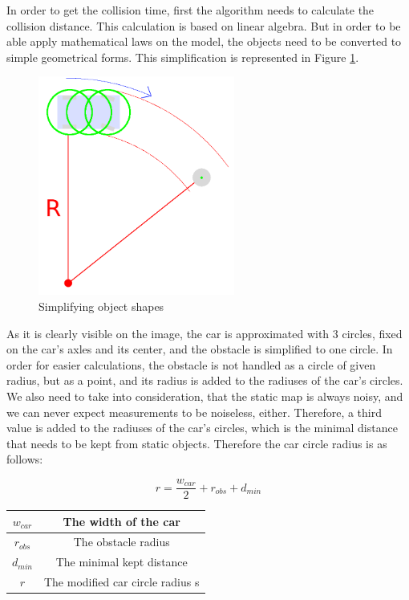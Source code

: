 In order to get the collision time, first the algorithm needs to calculate the collision distance. This calculation is based on linear algebra. But in order to be able apply mathematical laws on the model, the objects need to be converted to simple geometrical forms. This simplification is represented in Figure \ref{static_collision_time_check_object_simplification}.

\begin{figure}[!ht]
    \centering
    \includegraphics[height=72mm]{figures/raw/static_collision_time_check_object_simplification.png}
    \caption{Simplifying object shapes}
    \label{static_collision_time_check_object_simplification}
\end{figure}

As it is clearly visible on the image, the car is approximated with 3 circles, fixed on the car's axles and its center, and the obstacle is simplified to one circle. In order for easier calculations, the obstacle is not handled as a circle of given radius, but as a point, and its radius is added to the radiuses of the car's circles. We also need to take into consideration, that the static map is always noisy, and we can never expect measurements to be noiseless, either. Therefore, a third value is added to the radiuses of the car's circles, which is the minimal distance that needs to be kept from static objects. Therefore the car circle radius is as follows:

\begin{equation}\label{eq:car_circle_radius}
r = \frac{w_{car}}{2} + r_{obs} + d_{min}
\end{equation}

\begin{center}
    \begin{tabular}{ | c | c | }
        \hline
        $w_{car}$    & The width of the car             \\
        \hline
        $r_{obs}$    & The obstacle radius              \\
        \hline 
        $d_{min}$    & The minimal kept distance        \\
        \hline 
        $r$          & The modified car circle radius   s\\
        \hline
    \end{tabular}
\end{center}

